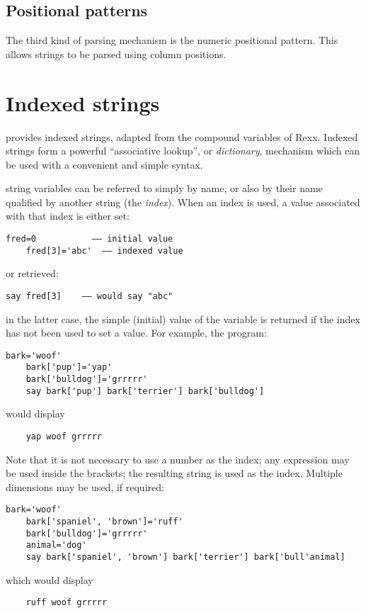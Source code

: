 \subsection{Positional patterns}
The third kind of parsing mechanism is the numeric positional pattern. This allows strings to be parsed using column positions.
\section{Indexed strings}
\nr{} provides indexed strings, adapted from the compound variables of Rexx. Indexed strings form a powerful “associative lookup”, or \emph{dictionary}, mechanism which can be used with a convenient and simple syntax.

\nr{} string variables can be referred to simply by name, or also by
their name qualified by another string (the \emph{index}). When an index is
used, a value associated with that index is either set:
\begin{lstlisting}[label=index,caption=Index]
    fred=0           –– initial value
    fred[3]='abc'  –– indexed value
\end{lstlisting}
or retrieved:
\begin{lstlisting}[label=retrieving,caption=Retrieving]
    say fred[3]    –– would say "abc"
\end{lstlisting}
in the latter case, the simple (initial) value of the variable is
returned if the index has not been used to set a value. For example,
the program:
\begin{lstlisting}[label=woof,caption=Woof]
    bark='woof'
    bark['pup']='yap'
    bark['bulldog']='grrrrr'
    say bark['pup'] bark['terrier'] bark['bulldog']
\end{lstlisting}
would display
\begin{verbatim}
    yap woof grrrrr
\end{verbatim}
Note that it is not necessary to use a number as the index; any
expression may be used inside the brackets; the resulting string is
used as the index. Multiple dimensions may be used, if required:
\begin{lstlisting}[label=dimensions,caption=Multiple Dimensions]
    bark='woof'
    bark['spaniel', 'brown']='ruff'
    bark['bulldog']='grrrrr'
    animal='dog'
    say bark['spaniel', 'brown'] bark['terrier'] bark['bull'animal]
\end{lstlisting}
which would display
\begin{verbatim}
    ruff woof grrrrr
\end{verbatim}
